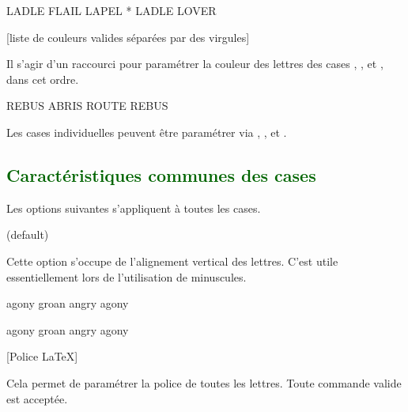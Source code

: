 \documentclass[svgnames]{report}
\newcommand\Section[1]{\subsection{\textcolor{DarkGreen}{#1}}}
\begin{document}
  \begin{example}
  \begin{GrilleSutom}[Formes={diamond,ellipse,star}]{LADLE}
     FLAIL
     LAPEL
     *
     LADLE
     LOVER
  \end{GrilleSutom}
  \end{example}

  [liste de couleurs valides séparées par des virgules]

  Il s'agir d'un raccourci pour paramétrer la couleur des lettres des cases   , ,  et , dans cet ordre.

  \begin{example}
  \begin{GrilleSutom}[CouleurLettres={red,orange,blue}]{REBUS}
    ABRIS
    ROUTE
    REBUS
  \end{GrilleSutom}
  \end{example}

  Les cases individuelles peuvent être paramétrer via , ,  et .


  \Section{Caractéristiques communes des cases}

  Les options suivantes s'appliquent à toutes les cases.

   (default) \qquad

  Cette option s'occupe de l'alignement vertical des lettres. C'est utile essentiellement lors de l'utilisation de minuscules.

  \begin{example}
  \begin{GrilleSutom}[align]{agony}
     groan
     angry
     agony
  \end{GrilleSutom}
  \end{example}

  \begin{example}
  \begin{GrilleSutom}{agony} %
    groan
    angry
    agony
  \end{GrilleSutom}
  \end{example}

       [Police \LaTeX]

  Cela permet de paramétrer la police de toutes les lettres. Toute commande valide est acceptée.
\end{document}
